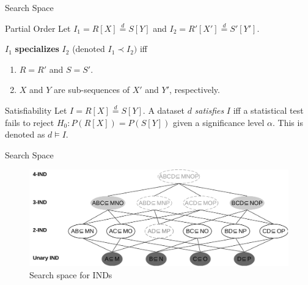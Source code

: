 \documentclass[10pt]{beamer}
\newcommand{\eqdist}{\stackrel{d}{=}}
\begin{document}
\begin{frame}{Search Space}
    \begin{block}{Partial Order}
        Let $I_1 = R[X] \eqdist S[Y]$ and $I_2 = R'[X'] \eqdist S'[Y']$.
        
        $I_1$ \textbf{specializes} $I_2$ (denoted $I_1 \prec I_2)$ iff
        \begin{enumerate}
            \item $R = R'$ and $S = S'$.
            \item $X$ and $Y$ are sub-sequences of $X'$ and $Y'$, respectively.
        \end{enumerate}
    \end{block}

    \begin{block}{Satisfiability}
    Let $I = R[X] \eqdist S[Y]$.
    A dataset $d$ \emph{satisfies} $I$ iff  a statistical test fails to reject $H_0: P(R[X]) = P(S[Y])$
    given a significance level $\alpha$.
    This is denoted as $d \models I$.
    \end{block}

\end{frame}

\begin{frame}{Search Space}
\begin{figure}
    \centering
    \includegraphics[width=\textwidth]{lattice.pdf}
    \caption{Search space for INDs}
\end{figure}
\end{frame}
\end{document}
